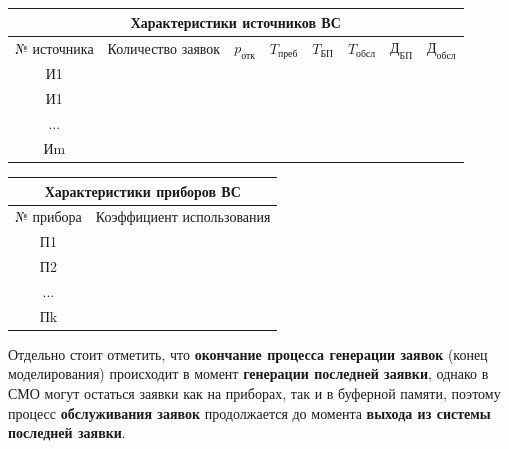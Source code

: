\documentclass[a4paper, 14pt]{article}
\begin{document}
\begin{center}
	\begin{tabular}{|c|c|c|c|c|c|c|c|}
		\hline
		\multicolumn{8}{|c|}{Характеристики источников ВС}                                                                                                   \\
		\hline
		№ источника & Количество заявок & $p_\text{отк}$ & $T_\text{преб}$ & $T_\text{БП}$ & $T_\text{обсл}$ & $\text{Д}_\text{БП}$ & $\text{Д}_\text{обсл}$ \\
		\hline
		И1          &                   &                &                 &               &                 &                      &                        \\
		\hline
		И1          &                   &                &                 &               &                 &                      &                        \\
		\hline
		...         &                   &                &                 &               &                 &                      &                        \\
		\hline
		Иm          &                   &                &                 &               &                 &                      &                        \\
		\hline
	\end{tabular}
\end{center}

\begin{center}
	\begin{tabular}{|c|c|}
		\hline
		\multicolumn{2}{|c|}{Характеристики приборов ВС} \\
		\hline
		№ прибора & Коэффициент использования            \\
		\hline
		П1        &                                      \\
		\hline
		П2        &                                      \\
		\hline
		...       &                                      \\
		\hline
		Пk        &                                      \\
		\hline
	\end{tabular}
\end{center}

Отдельно стоит отметить, что \textbf{окончание процесса генерации заявок} (конец моделирования) происходит в момент \textbf{генерации последней заявки}, однако в СМО могут остаться заявки как на приборах, так и в буферной памяти, поэтому процесс \textbf{обслуживания заявок} продолжается до момента \textbf{выхода из системы последней заявки}.
\end{document}
